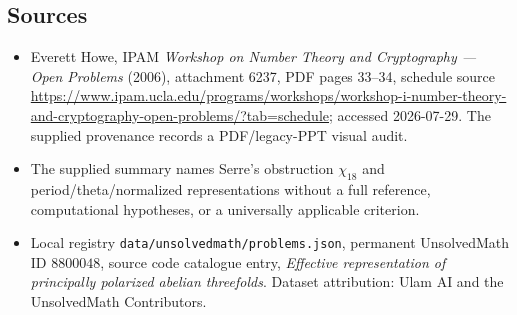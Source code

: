 \documentclass[11pt]{article}
\begin{document}
\subsection{Sources}
\begin{itemize}
\item Everett Howe, IPAM \emph{Workshop on Number Theory and Cryptography --- Open Problems} (2006), attachment 6237, PDF pages 33--34, schedule source \url{https://www.ipam.ucla.edu/programs/workshops/workshop-i-number-theory-and-cryptography-open-problems/?tab=schedule}; accessed 2026-07-29. The supplied provenance records a PDF/legacy-PPT visual audit.
\item The supplied summary names Serre's obstruction $\chi_{18}$ and period/theta/normalized representations without a full reference, computational hypotheses, or a universally applicable criterion.
\item Local registry \texttt{data/unsolvedmath/problems.json}, permanent UnsolvedMath ID $8800048$, source code catalogue entry, \emph{Effective representation of principally polarized abelian threefolds}. Dataset attribution: Ulam AI and the UnsolvedMath Contributors.
\end{itemize}
\end{document}

